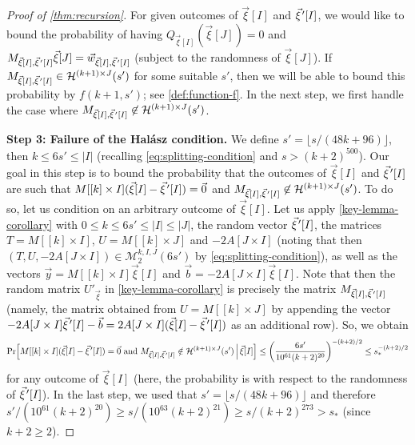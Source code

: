 \documentclass[english]{article}
\theoremstyle{remark}
\numberwithin{equation}{section}
\numberwithin{figure}{section}
\newcommand{\pvec}[1]{\vec{#1}\mkern2mu\vphantom{#1}'}
\let\originalleft\left
\let\originalright\right
\renewcommand{\left}{\mathopen{}\mathclose\bgroup\originalleft}
\renewcommand{\right}{\aftergroup\egroup\originalright}
\begin{document}
\begin{proof}[Proof of \cref{thm:recursion}]
For given outcomes of $\vec{\xi}[I]$ and $\pvec{\xi}[I]$, we would like to bound the probability of having $Q_{\vec \xi[I]}(\vec{\xi}[J])=0$ and $M_{\vec \xi[I],\pvec{\xi}[I]}\vec\xi[J]=\vec{w}_{\vec \xi[I],\pvec{\xi}[I]}$ (subject to the randomness of $\vec\xi[J]$). If $M_{\vec \xi[I],\pvec{\xi}[I]}\in \mathcal{H}^{(k+1)\times J}(s')$ for some suitable $s'$, then we will be able to bound this probability by $f(k+1,s')$; see \cref{def:function-f}. In the next step, we first handle the case where $M_{\vec \xi[I],\pvec{\xi}[I]}\not\in \mathcal{H}^{(k+1)\times J}(s')$.

\textbf{Step 3: Failure of the Hal\'asz condition.} We define $s'=\lfloor s/(48k+96)\rfloor$, then $k\le 6s'\le |I|$ (recalling \cref{eq:splitting-condition} and $s>(k+2)^{500}$). Our goal in this step is to bound the probability that the outcomes of $\vec{\xi}[I]$ and $\pvec{\xi}[I]$ are such that $M[[k]\times I](\vec{\xi}[I]-\pvec{\xi}[I])=\vec 0$ and $M_{\vec \xi[I],\pvec{\xi}[I]}\not\in \mathcal{H}^{(k+1)\times J}(s')$. To do so, let us condition on an arbitrary outcome of $\vec\xi[I]$. Let us apply \cref{key-lemma-corollary} with $0\le k\le 6s'\le |I|\le |J|$, the random vector $\pvec{\xi}[I]$, the matrices $T=M[[k]\times I]$, $U=M[[k]\times J]$ and $-2A[J\times I]$ (noting that then $(T,U,-2A[J\times I])\in \mathcal{M}_2^{k,I,J}(6s')$ by \cref{eq:splitting-condition}), as well as the vectors $\vec y=M[[k]\times I]\vec \xi[I]$ and $\vec b=-2A[J\times I]\vec \xi[I]$. Note that then the random matrix $U'_{\vec\xi}$ in \cref{key-lemma-corollary} is precisely the matrix $M_{\vec \xi[I],\pvec{\xi}[I]}$ (namely, the matrix obtained from $U=M[[k]\times J]$ by appending the vector $-2A[J\times I]\pvec\xi[I]-\vec b=2A[J\times I](\vec\xi[I]-\pvec{\xi}[I])$ as an additional row). So, we obtain 
\begin{equation}\label{eq:recursion-bound-Halasz-failure}
\Pr\left[M[[k]\times I](\vec{\xi}[I]-\pvec{\xi}[I])=\vec 0\text{ and }M_{\vec \xi[I],\pvec{\xi}[I]}\notin \mathcal H^{(k+1)\times J}(s') \,\middle|\,\vec{\xi}[I]\right]\le \left(\frac{6s'}{10^{61}(k+2)^{20}}\right)^{-(k+2)/2}\le s_*^{-(k+2)/2}
\end{equation}
for any outcome of $\vec\xi[I]$ (here, the probability is with respect to the randomness of $\pvec\xi[I]$).  In the last step, we used that $s'=\lfloor s/(48k+96)\rfloor$ and therefore $s'/(10^{61}(k+2)^{20})\ge s/(10^{63}(k+2)^{21})\ge s/(k+2)^{273}>s_*$ (since $k+2\ge 2$).


\end{proof}
\end{document}

